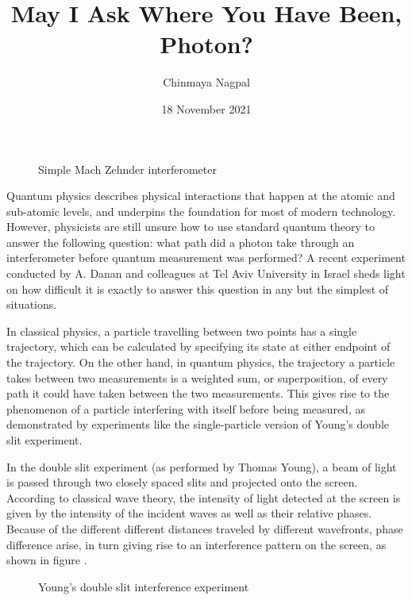 \documentclass{article}
\author{Chinmaya Nagpal}
\title{May I Ask Where You Have Been, Photon?}
\date{18 November 2021}
\begin{document}
\maketitle

\begin{figure}[ht]
	
	\caption{Simple Mach Zehnder interferometer}
	\label{fig:interferometer1}
\end{figure}

Quantum physics describes physical interactions that happen at the atomic and
sub-atomic levels, and underpins the foundation for most of modern technology.
However, physicists are still unsure how to use standard quantum theory to 
answer the following question: what path did a photon take through an 
interferometer before quantum measurement was performed?  A recent experiment 
conducted by A. Danan and colleagues at Tel Aviv University in Israel sheds 
light on how difficult it is exactly to answer this question in any but the 
simplest of situations. 

In classical physics, a particle travelling between two points has a single
trajectory, which can be calculated by specifying its state at either endpoint
of the trajectory. On the other hand, in quantum physics, the trajectory a
particle takes between two measurements is a weighted sum, or superposition, of
every path it could have taken between the two measurements. This gives rise to
the phenomenon of a particle interfering with itself before being measured, as
demonstrated by experiments like the single-particle version of Young's double
slit experiment. 

In the double slit experiment (as performed by Thomas Young), a beam of light 
is passed through two closely spaced slits and projected onto the screen.  
According to classical wave theory, the intensity of light detected at the 
screen is given by the intensity of the incident waves as well as their 
relative phases. Because of the different different distances traveled by 
different wavefronts, phase difference arise, in turn giving rise to an 
interference pattern on the screen, as shown in figure 
\label{fig:uncollimated}. 

\begin{figure}
	\caption{Young's double slit interference experiment}
	\label{fig:double-slit}
\end{figure}
\end{document}
